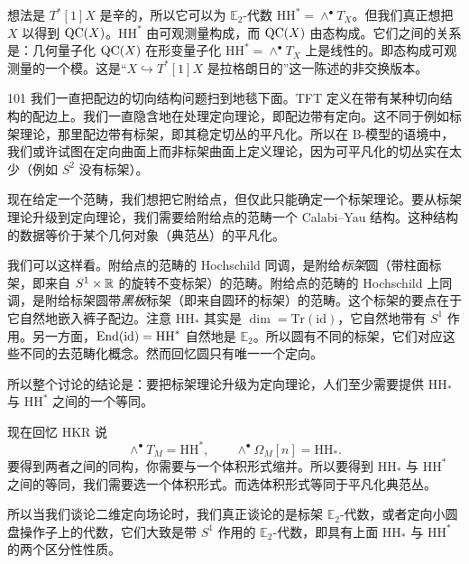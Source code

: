 想法是 $T^*[1]X$ 是辛的，所以它可以为 $\mathbb{E}_2$-代数 $\mathrm{HH}^*=\wedge^\bullet T_X$。但我们真正想把 $X$ 以得到 $\mathrm{QC}(X)$。$\mathrm{HH}^*$ 由可观测量构成，而 $\mathrm{QC}(X)$ 由态构成。它们之间的关系是：几何量子化 $\mathrm{QC}(X)$ 在形变量子化 $\mathrm{HH}^*=\wedge^\bullet T_X$ 上是线性的。即态构成可观测量的一个模。这是“$X\hookrightarrow T^*[1]X$ 是拉格朗日的”这一陈述的非交换版本。

\begin{srcrem}{101}
我们一直把配边的切向结构问题扫到地毯下面。TFT 定义在带有某种切向结构的配边上。我们一直隐含地在处理定向理论，即配边带有定向。这不同于例如标架理论，那里配边带有标架，即其稳定切丛的平凡化。所以在 B-模型的语境中，我们或许试图在定向曲面上而非标架曲面上定义理论，因为可平凡化的切丛实在太少（例如 $S^2$ 没有标架）。
\end{srcrem}

现在给定一个范畴，我们想把它附给点，但仅此只能确定一个标架理论。要从标架理论升级到定向理论，我们需要给附给点的范畴一个 Calabi–Yau 结构。这种结构的数据等价于某个几何对象（典范丛）的平凡化。

我们可以这样看。附给点的范畴的 Hochschild 同调，是附给\emph{标架}圆（带柱面标架，即来自 $S^1\times\mathbb{R}$ 的旋转不变标架）的范畴。附给点的范畴的 Hochschild 上同调，是附给标架圆带\emph{黑板}标架（即来自圆环的标架）的范畴。这个标架的要点在于它自然地嵌入裤子配边。注意 $\mathrm{HH}_*$ 其实是 $\dim=\mathrm{Tr}(\mathrm{id})$，它自然地带有 $S^1$ 作用。另一方面，$\mathrm{End}(\mathrm{id})=\mathrm{HH}^*$ 自然地是 $\mathbb{E}_2$。所以圆有不同的标架，它们对应这些不同的去范畴化概念。然而回忆圆只有唯一一个定向。

所以整个讨论的结论是：要把标架理论升级为定向理论，人们至少需要提供 $\mathrm{HH}_*$ 与 $\mathrm{HH}^*$ 之间的一个等同。

现在回忆 HKR 说
\begin{equation}\tag{14.43}
\wedge^\bullet T_M=\mathrm{HH}^*,\qquad \wedge^\bullet\Omega_M[n]=\mathrm{HH}_*.
\end{equation}
要得到两者之间的同构，你需要与一个体积形式缩并。所以要得到 $\mathrm{HH}_*$ 与 $\mathrm{HH}^*$ 之间的等同，我们需要选一个体积形式。而选体积形式等同于平凡化典范丛。

所以当我们谈论二维定向场论时，我们真正谈论的是标架 $\mathbb{E}_2$-代数，或者定向小圆盘操作子上的代数，它们大致是带 $S^1$ 作用的 $\mathbb{E}_2$-代数，即具有上面 $\mathrm{HH}_*$ 与 $\mathrm{HH}^*$ 的两个区分性性质。

